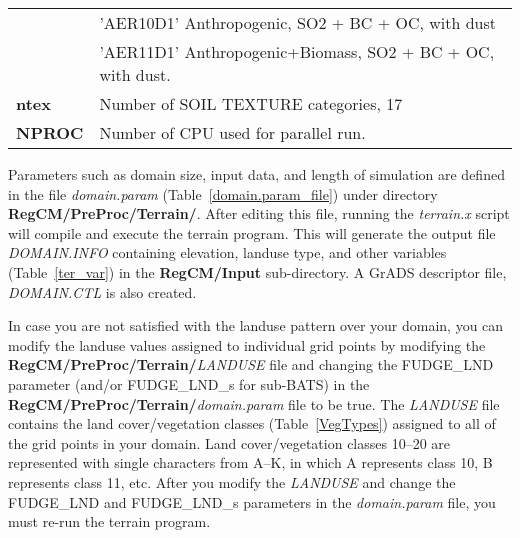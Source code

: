 \begin{table}[h]
\begin{center}
\begin{tabular}{|l|l|}
&  \vspace{-0.15 cm} \hspace{0.5 cm} {\footnotesize 'AER10D1'}  \hspace{0.5 cm} {\footnotesize Anthropogenic, SO2 + BC + OC, with dust}\\
&  \vspace{-0.15 cm} \hspace{0.5 cm} {\footnotesize 'AER11D1'}  \hspace{0.5 cm} {\footnotesize Anthropogenic+Biomass, SO2 + BC + OC, with dust.}\\
\hline
{\footnotesize {\bf ntex}}   & {\footnotesize Number of SOIL TEXTURE categories, 17} \\ \hline
{\footnotesize {\bf NPROC}}   & {\footnotesize Number of CPU used for parallel run.} \\ \hline
\hline
\end{tabular}
\end{center}
\end{table}

Parameters such as domain size, input data, and length of simulation are defined in the file {\it domain.param} (Table~\ref{domain.param_file}) under directory {\bf RegCM/PreProc/Terrain/}.  After editing this file, running the {\it terrain.x} script will compile and execute the terrain program.  This will generate the output file {\it DOMAIN.INFO} containing elevation, landuse type, and other variables (Table~\ref{ter_var})  in the {\bf RegCM/Input} sub-directory.  A GrADS descriptor file, {\it DOMAIN.CTL} is also created.

In case you are not satisfied with the landuse pattern over your domain, you 
can modify the landuse values assigned to individual grid points by modifying the
{\bf RegCM/PreProc/Terrain/}{\it LANDUSE} file and changing the FUDGE\_LND parameter (and/or FUDGE\_LND\_s for sub-BATS) in the
{\bf RegCM/PreProc/Terrain/}{\it domain.param} file to be true.  The {\it LANDUSE} file 
contains the land cover/vegetation classes (Table~\ref{VegTypes}) assigned to all 
of the grid points in your domain.  Land cover/vegetation classes 10--20 are 
represented with single characters from A--K, in which A represents class 10, 
B represents class 11, etc.  After you modify the {\it LANDUSE} and change the
FUDGE\_LND and FUDGE\_LND\_s parameters in the {\it domain.param} file, you must re-run the terrain 
program.

